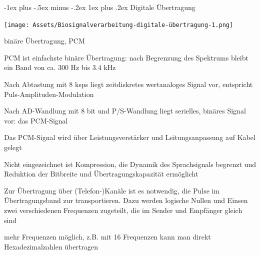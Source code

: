 \documentclass[a4paper]{article}
\makeatletter
\renewcommand{\subsubsection}{\@startsection{subsubsection}{3}{0mm}%
 {-1ex plus -.5ex minus -.2ex}%
 {1ex plus .2ex}%
 {\normalfont\small\bfseries}}
\makeatother
\begin{document}
\begin{multicols}{3}
  \subsubsection{Digitale Übertragung}\label{digitale-uebertragung}
  \begin{center}
    \texttt{[image: Assets/Biosignalverarbeitung-digitale-übertragung-1.png]}
  \end{center}
  binäre Übertragung, PCM
  \begin{itemize*}
    \item PCM ist einfachste binäre Übertragung: nach Begrenzung des Spektrums bleibt ein Band von ca. 300 Hz bis 3.4 kHz
    \begin{itemize*}
      \item Nach Abtastung mit 8 ksps liegt zeitdiskretes wertanaloges Signal vor, entspricht Puls-Amplituden-Modulation
      \item Nach AD-Wandlung mit 8 bit und P/S-Wandlung liegt serielles, binäres Signal vor: das PCM-Signal
      \item Das PCM-Signal wird über Leistungsverstärker und Leitungsanpassung auf Kabel gelegt
      \item Nicht eingezeichnet ist Kompression, die Dynamik des Sprachsignals begrenzt und Reduktion der Bitbreite und Übertragungskapazität ermöglicht
    \end{itemize*}
    \item Zur Übertragung über (Telefon-)Kanäle ist es notwendig, die Pulse im Übertragungsband zur transportieren. Dazu werden logische Nullen und Einsen zwei verschiedenen Frequenzen zugeteilt, die im Sender und Empfänger gleich sind
    \item mehr Frequenzen möglich, z.B. mit 16 Frequenzen kann man direkt Hexadezimalzahlen übertragen
  \end{itemize*}


\end{multicols}
\end{document}
